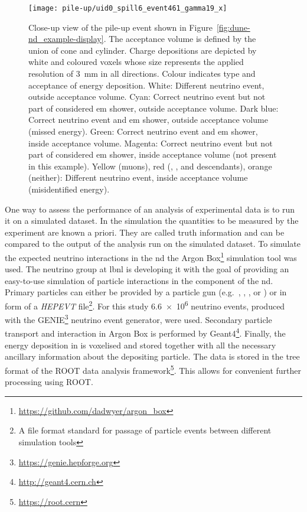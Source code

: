 \begin{figure}[htb]
	\centering
	\texttt{[image: pile-up/uid0\_spill6\_event461\_gamma19\_x]}
	\caption[Pile-up study example event zoom]{%
		Close-up view of the pile-up event shown in Figure~\ref{fig:dune-nd_example-display}.
		The acceptance volume is defined by the union of cone and cylinder.
		Charge depositions are depicted by white and coloured voxels whose size represents the applied resolution of \SI{3}{\milli\metre} in all directions.
		Colour indicates type and acceptance of energy deposition.
		White: Different neutrino event, outside acceptance volume.
		Cyan: Correct neutrino event but not part of considered \acrshort{em} shower, outside acceptance volume.
		Dark blue: Correct neutrino event and \acrshort{em} shower, outside acceptance volume (missed energy).
		Green: Correct neutrino event and \acrshort{em} shower, inside acceptance volume.
		Magenta: Correct neutrino event but not part of considered \acrshort{em} shower, inside acceptance volume (not present in this example).
		Yellow (muons), red (\Pgg, \Pn, and descendants), orange (neither): Different neutrino event, inside acceptance volume (misidentified energy).
	}
	\label{fig:dune-nd_example-display-zoom}
\end{figure}

One way to assess the performance of an analysis of experimental data is to run it on a simulated dataset.
In the simulation the quantities to be measured by the experiment are known a priori.
They are called truth information and can be compared to the output of the analysis run on the simulated dataset.
To simulate the expected neutrino interactions in the \gls{nd} the Argon Box\footnote{\url{https://github.com/dadwyer/argon_box}} simulation tool was used.
The neutrino group at \gls{lbnl} is developing it with the goal of providing an easy-to-use simulation of particle interactions in the \lar{} component of the \gls{nd}.
Primary particles can either be provided by a particle gun (e.g.\ \Pem, \Pn, \Pp, or \Pgmp) or in form of a \emph{HEPEVT} file\footnote{A file format standard for passage of particle events between different simulation tools}.
For this study \num{6.6e6} neutrino events, produced with the GENIE\footnote{\url{https://genie.hepforge.org}} neutrino event generator, were used.
Secondary particle transport and interaction in Argon Box is performed by Geant4\footnote{\url{http://geant4.cern.ch}}.
Finally, the energy deposition in \lar{} is voxelised and stored together with all the necessary ancillary information about the depositing particle.
The data is stored in the tree format of the ROOT data analysis framework\footnote{\url{https://root.cern}}.
This allows for convenient further processing using ROOT.

